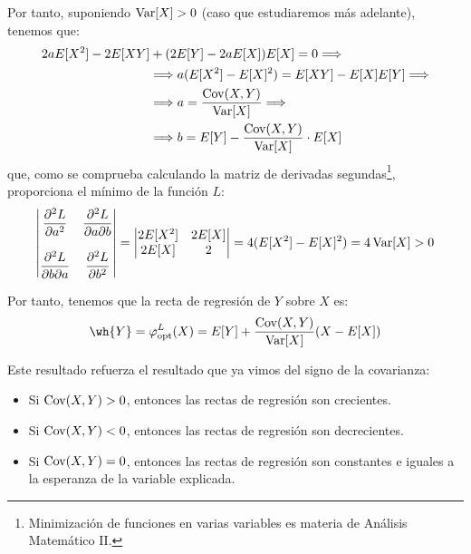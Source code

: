 Por tanto, suponiendo $\operatorname{Var}[X]> 0$ (caso que estudiaremos más adelante), tenemos que:
\begin{align*}
    2aE[X^2] - 2E[XY] &+ (2E[Y] - 2aE[X])E[X] = 0
    \Longrightarrow  \\ &\Longrightarrow
    a(E[X^2] - E[X]^2) = E[XY] - E[X]E[Y]
    \Longrightarrow \\ &\Longrightarrow
    a = \dfrac{\operatorname{Cov}(X,Y)}{\operatorname{Var}[X]}
    \Longrightarrow  \\ &\Longrightarrow
    b = E[Y] - \dfrac{\operatorname{Cov}(X,Y)}{\operatorname{Var}[X]} \cdot E[X]
\end{align*}
que, como se comprueba calculando la matriz de derivadas segundas\footnote{Minimización de funciones en varias variables es materia de Análisis Matemático II.}, proporciona el mínimo de la función $L$:
\begin{equation*}
    \begin{vmatrix}
        \dfrac{\partial^2 L}{\partial a^2} & \dfrac{\partial^2 L}{\partial a\partial b}\\ \\
        \dfrac{\partial^2 L}{\partial b\partial a} & \dfrac{\partial^2 L}{\partial b^2}
    \end{vmatrix} =
    \begin{vmatrix}
        2E[X^2] & 2E[X]\\
        2E[X] & 2
    \end{vmatrix} = 4(E[X^2] - E[X]^2) = 4\operatorname{Var}[X] > 0
\end{equation*}

Por tanto, tenemos que la recta de regresión de $Y$ sobre $X$ es:
\begin{equation*}
    \wh{Y}=\varphi_{\text{opt}}^L(X) = E[Y] + \dfrac{\Cov(X,Y)}{\Var[X]}(X - E[X])
\end{equation*}

Este resultado refuerza el resultado que ya vimos del signo de la covarianza:
\begin{itemize}
    \item Si $\operatorname{Cov}(X,Y)>0$, entonces las rectas de regresión son crecientes.
    \item Si $\operatorname{Cov}(X,Y)<0$, entonces las rectas de regresión son decrecientes.
    \item Si $\operatorname{Cov}(X,Y)=0$, entonces las rectas de regresión son constantes e iguales a la esperanza de la variable explicada.
\end{itemize}

